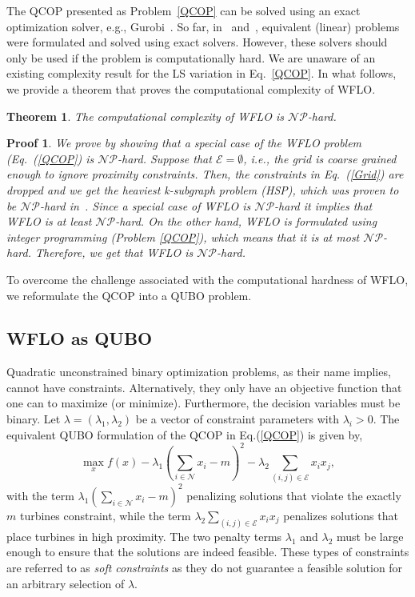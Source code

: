 \documentclass[preprint,12pt]{elsarticle}
\newtheorem{mythm}{Theorem}
\newtheorem{myproof}{Proof}
\begin{document}
The QCOP presented as Problem~\ref{QCOP} can be solved using an exact optimization solver, e.g., Gurobi~\cite{gurobi}. 
So far, in~\cite{Zhang2014} and~\cite{donovan2005wind}, equivalent (linear) problems were formulated and solved using 
exact solvers. However, these solvers should only be used if the problem is computationally hard.
We are unaware of an existing complexity result for the LS variation in Eq.~\ref{QCOP}. In what follows, we provide
a theorem that proves the computational complexity of WFLO. 
\begin{mythm}
	The computational complexity of WFLO is $\mathcal{NP}$-hard. 
\end{mythm}
\begin{myproof}
We prove by showing that a special case of the WFLO problem (Eq.~(\ref{QCOP}) is
$\mathcal{NP}$-hard. Suppose that $\mathcal{E} = \emptyset$, i.e., the grid is coarse grained enough to ignore proximity constraints. Then, the constraints in Eq.~(\ref{Grid})
are dropped and we get the heaviest k-subgraph problem (HSP), which was proven to be $\mathcal{NP}$-hard in~\cite{billionnet2005different}.
Since a special case of WFLO is  $\mathcal{NP}$-hard it implies that WFLO is at least $\mathcal{NP}$-hard. On the other hand,
WFLO is formulated using integer programming (Problem \ref{QCOP}), which means that it is at most $\mathcal{NP}$-hard. Therefore, we get that WFLO is $\mathcal{NP}$-hard.
	\end{myproof} To overcome the challenge associated with the computational hardness of WFLO,
we reformulate the QCOP into a QUBO problem.  


\subsection{WFLO as QUBO}

Quadratic unconstrained binary optimization problems, as their name implies, cannot have constraints. Alternatively, they only 
have an objective function that 
one can to maximize (or minimize). Furthermore, the decision variables must be binary. Let $\lambda = (\lambda_1,\lambda_2)$ 
be a vector of constraint parameters with $\lambda_i >0$. The equivalent QUBO formulation of the QCOP in Eq.(\ref{QCOP}) is given by,
\begin{equation}\max_{x}^{} f(x) - \lambda_1 (\sum_{i \in \mathcal{N}}^{} x_i -m) ^2 - \lambda_2 \sum_{(i,j) \in \mathcal{E}}^{} x_i x_j , \label{QUBO}\end{equation}
with the term $ \lambda_1 (\sum_{i \in \mathcal{N}}^{} x_i -m) ^2$ 
penalizing solutions that violate the exactly $m$ turbines constraint, while the term $\lambda_2 \sum_{(i,j) \in \mathcal{E}}^{} x_i x_j$ penalizes
solutions that place turbines in high proximity. The two penalty terms $\lambda_1$ and $\lambda_2$ 
must be large enough to ensure that the solutions are indeed feasible. These types of constraints
are referred to as \emph{soft constraints} as they do not guarantee a feasible solution 
for an arbitrary selection of $\lambda$.   
\end{document}
